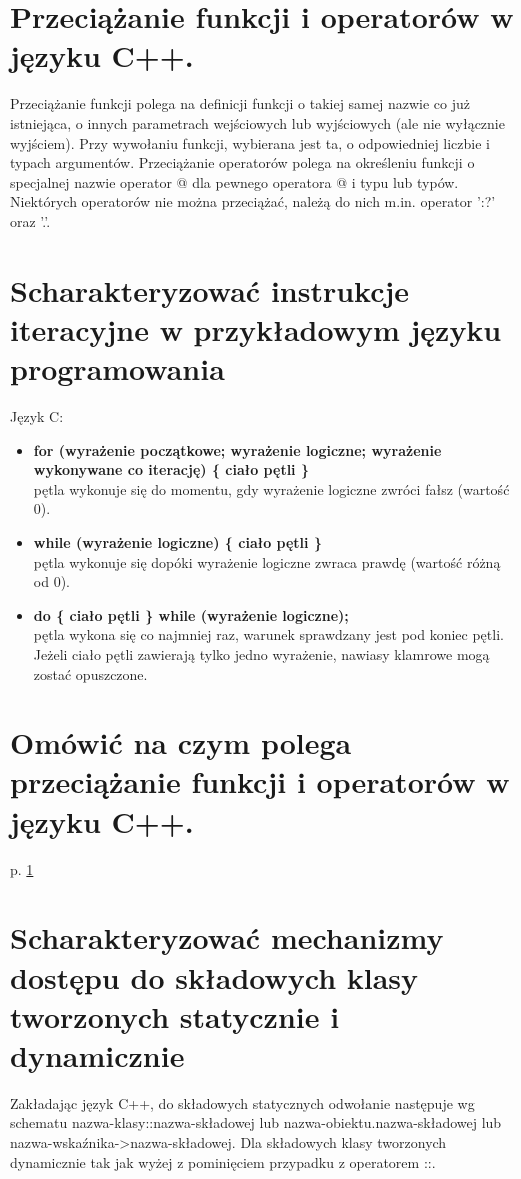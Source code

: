 \documentclass[12pt,a4paper]{article}
\begin{document}
	\section{Przeciążanie funkcji i operatorów w języku C++.}
	\label{sec:przecfuncpp}
	Przeciążanie funkcji polega na definicji funkcji o takiej samej nazwie co już istniejąca, o innych parametrach wejściowych lub wyjściowych (ale nie wyłącznie wyjściem). Przy wywołaniu funkcji, wybierana jest ta, o odpowiedniej liczbie i typach argumentów.
	Przeciążanie operatorów polega na określeniu funkcji o specjalnej nazwie operator @ dla pewnego operatora @ i typu lub typów. Niektórych operatorów nie można przeciążać, należą do nich m.in. operator ':?' oraz '.'.

	\section{Scharakteryzować instrukcje iteracyjne w przykładowym języku programowania}
	Język C:
	\begin{itemize}
		\item \textbf{for (wyrażenie początkowe; wyrażenie logiczne; wyrażenie wykonywane co iterację) \{ ciało pętli \}}\\
		pętla wykonuje się do momentu, gdy wyrażenie logiczne zwróci fałsz (wartość 0).
	
		\item \textbf{while (wyrażenie logiczne) \{ ciało pętli \}}\\	
		pętla wykonuje się dopóki wyrażenie logiczne zwraca prawdę (wartość różną od 0).
		
		\item \textbf{do \{ ciało pętli \} while (wyrażenie logiczne);}\\
		pętla wykona się co najmniej raz, warunek sprawdzany jest pod koniec pętli. Jeżeli ciało pętli zawierają tylko jedno wyrażenie, nawiasy klamrowe mogą zostać opuszczone.
	\end{itemize}

	\section{Omówić na czym polega przeciążanie funkcji i operatorów w języku C++.}
	p. \ref{sec:przecfuncpp}

	\section{Scharakteryzować mechanizmy dostępu do składowych klasy tworzonych statycznie i dynamicznie}
	Zakładając język C++, do składowych statycznych odwołanie następuje wg schematu nazwa-klasy::nazwa-składowej lub nazwa-obiektu.nazwa-składowej lub nazwa-wskaźnika->nazwa-składowej. Dla składowych klasy tworzonych dynamicznie tak jak wyżej z pominięciem przypadku z operatorem ::.
\end{document}
